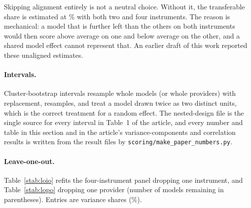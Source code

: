 \documentclass[12pt]{article}
\begin{document}
Skipping alignment entirely is not a neutral choice. Without it, the transferable share is estimated at
\UnalignedTwoM\% with both two and four instruments. The reason is mechanical: a model that is further left than the
others on both instruments would then score above average on one and below average on the other,
and a shared model effect cannot represent that. An earlier draft of this work reported these unaligned
estimates.

\begin{table}[H]
\centering
\caption{Sensitivity of the nested variance shares (\%) to the direction
convention. M$\times$I and M$\times$A: model $\times$ instrument and model
$\times$ axis(instrument).}
\label{stab:orient}
\footnotesize
\setlength{\tabcolsep}{3pt}

\end{table}

\paragraph{Intervals.} Cluster-bootstrap intervals resample whole models (or whole
providers) with replacement, \NBoot{} resamples, and treat a model drawn twice as two
distinct units, which is the correct treatment for a random effect. The
nested-design file is the single source for every interval in Table~1 of the
article, and every number and table in this section and in the article's
variance-components and correlation results is written from the result files by
\texttt{scoring/make\_paper\_numbers.py}.

\paragraph{Leave-one-out.} Table~\ref{stab:loio} refits the four-instrument panel dropping one
instrument, and Table~\ref{stab:lopo} dropping one provider (number of
models remaining in parentheses). Entries are variance shares (\%).

\begin{table}[H]
\centering
\caption{Leave-one-instrument-out variance shares (\%), four-instrument panel
(3{,}000 administrations before omission). M$\times$I and M$\times$A: model $\times$ instrument and model $\times$ axis(instrument). Last column: model share in the
two-term specification.}
\label{stab:loio}
\footnotesize
\setlength{\tabcolsep}{3pt}

\end{table}

\begin{table}[H]
\centering
\caption{Leave-one-provider-out variance shares (\%), four-instrument panel.}
\label{stab:lopo}
\footnotesize
\setlength{\tabcolsep}{3pt}

\end{table}
\end{document}
